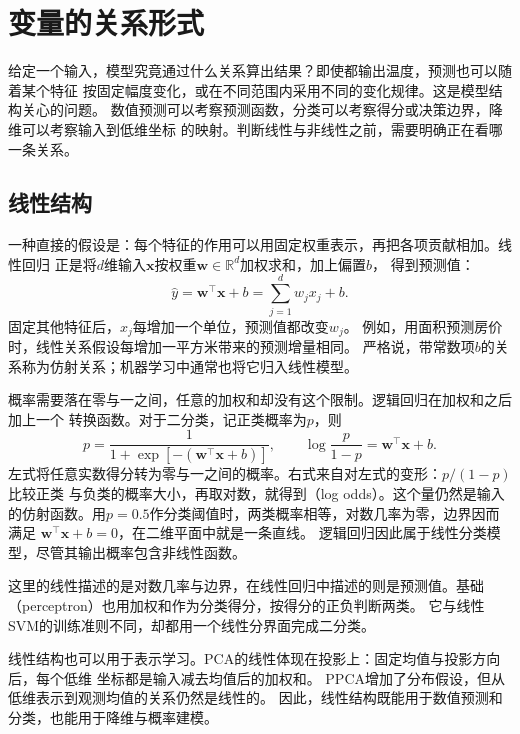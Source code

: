 \section{变量的关系形式}
\label{sec:models-structure}

给定一个输入，模型究竟通过什么关系算出结果？即使都输出温度，预测也可以随着某个特征
按固定幅度变化，或在不同范围内采用不同的变化规律。这是模型结构关心的问题。
数值预测可以考察预测函数，分类可以考察得分或决策边界，降维可以考察输入到低维坐标
的映射。判断线性与非线性之前，需要明确正在看哪一条关系。

\subsection{线性结构}
\label{sec:models-linear}

一种直接的假设是：每个特征的作用可以用固定权重表示，再把各项贡献相加。线性回归
正是将$d$维输入$\bm{x}$按权重$\bm{w}\in\mathbb{R}^{d}$加权求和，加上偏置$b$，
得到预测值：
\begin{equation}
  \hat{y}=\bm{w}^{\top}\bm{x}+b
  =\sum_{j=1}^{d}w_jx_j+b.
  \label{eq:models-linear-score}
\end{equation}
固定其他特征后，$x_j$每增加一个单位，预测值都改变$w_j$。
例如，用面积预测房价时，线性关系假设每增加一平方米带来的预测增量相同。
严格说，带常数项$b$的关系称为仿射关系；机器学习中通常也将它归入线性模型。

概率需要落在零与一之间，任意的加权和却没有这个限制。逻辑回归在加权和之后加上一个
转换函数。对于二分类，记正类概率为$p$，则
\begin{equation}
  p=\frac{1}{1+\exp[-(\bm{w}^{\top}\bm{x}+b)]},
  \qquad
  \log\frac{p}{1-p}=\bm{w}^{\top}\bm{x}+b.
  \label{eq:models-logistic-structure}
\end{equation}
左式将任意实数得分转为零与一之间的概率。右式来自对左式的变形：$p/(1-p)$比较正类
与负类的概率大小，再取对数，就得到（log odds）。这个量仍然是输入
的仿射函数。用$p=0.5$作分类阈值时，两类概率相等，对数几率为零，边界因而满足
$\bm{w}^{\top}\bm{x}+b=0$，在二维平面中就是一条直线。
逻辑回归因此属于线性分类模型，尽管其输出概率包含非线性函数。

这里的线性描述的是对数几率与边界，在线性回归中描述的则是预测值。基础
（perceptron）也用加权和作为分类得分，按得分的正负判断两类。
它与线性SVM的训练准则不同，却都用一个线性分界面完成二分类。

线性结构也可以用于表示学习。PCA的线性体现在投影上：固定均值与投影方向后，每个低维
坐标都是输入减去均值后的加权和。
PPCA增加了分布假设，但从低维表示到观测均值的关系仍然是线性的。
因此，线性结构既能用于数值预测和分类，也能用于降维与概率建模。

